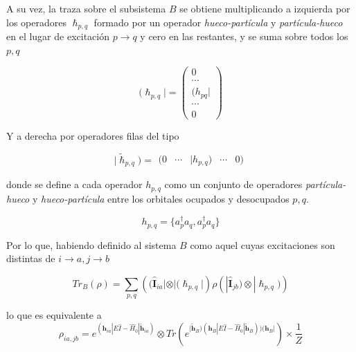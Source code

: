 \documentclass{beamer}
\begin{document}
\begin{frame}
  \small
A su vez, la traza sobre el subsistema $B$  se obtiene multiplicando a izquierda por 
los operadores $\bm{\hslash}_{p,q}$ formado por un operador \textit{hueco-partícula} y 
\textit{partícula-hueco} en el lugar de excitación $p\rightarrow q$ y cero en las restantes, y 
se suma sobre todos los $p,q$


\begin{equation*}
	( \bm{\hslash}_{p,q} | = \left(\begin{matrix}
		0 \\
		\cdots \\
		(h_{pq}| \\
		\cdots \\
		0
	\end{matrix} \right)
\end{equation*}

Y a derecha por operadores filas del tipo

\begin{equation*}
	| \widetilde{\bm{\hslash}}_{p,q} ) = \begin{matrix}
		( 0 &\cdots& |h_{p,q})& \cdots& 0)
	\end{matrix}
\end{equation*}

donde se define a cada operador $h_{p,q}$ como un conjunto de operadores 
\textit{partícula-hueco} y \textit{hueco-partícula} entre los orbitales ocupados y desocupados $p,q$.

\begin{equation*}
	h_{p,q} = \{a^\dagger_p a_q, a^\dagger_p a_q \}
\end{equation*}

\end{frame}


\begin{frame}
  Por lo que, habiendo definido al sistema $B$ como aquel cuyas excitaciones son distintas de 
$i\rightarrow a, j \rightarrow b$  

\begin{equation*}
	Tr_B(\rho) = \sum_{p,q}  \left( (\bm{\hat{I}}_{ia}| \otimes| ( \bm{\hslash}_{p,q} | \right) \rho  \left( |\bm{\hat{I}}_{jb}) \otimes |\bm{\hslash}_{p,q}) \right)
\end{equation*}

lo que es equivalente a 
\begin{equation*}
  \rho_{ia,jb} = e^{ { (\bm{h}_{ia}| E \hat{I} - \hat{H}_0 | 
	\bm{\widetilde{h}}_{ia} ) }} \otimes
	Tr(e^{| {\bm{\widetilde{h}}_B ) (\bm{h}_B| E \hat{I} - \hat{H}_0 | 
	\bm{\widetilde{h}}_B ) )   (\bm{h}_B|}} )\times \frac{1}{Z}
\end{equation*}

\end{frame}
\end{document}
